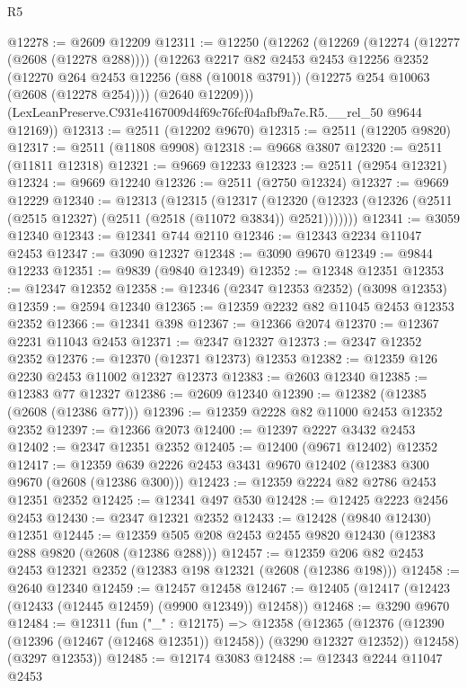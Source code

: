 \begin{lexlean}{R5}
\begin{coremodule}
@12278 := @2609 @12209
@12311 := @12250
    (@12262
      (@12269
        (@12274 (@12277 (@2608 (@12278 @288))))
        (@12263
          @2217
          @82
          @2453
          @2453
          @12256
          @2352
          (@12270 @264 @2453 @12256 (@88 (@10018 @3791)) (@12275 @254 @10063 (@2608 (@12278 @254))))
          (@2640 @12209)))
      (LexLeanPreserve.C931e4167009d4f69c76fcf04afbf9a7e.R5.__rel_50 @9644 @12169))
@12313 := @2511 (@12202 @9670)
@12315 := @2511 (@12205 @9820)
@12317 := @2511 (@11808 @9908)
@12318 := @9668 @3807
@12320 := @2511 (@11811 @12318)
@12321 := @9669 @12233
@12323 := @2511 (@2954 @12321)
@12324 := @9669 @12240
@12326 := @2511 (@2750 @12324)
@12327 := @9669 @12229
@12340 := @12313
    (@12315
      (@12317
        (@12320 (@12323 (@12326 (@2511 (@2515 @12327) (@2511 (@2518 (@11072 @3834)) @2521)))))))
@12341 := @3059 @12340
@12343 := @12341 @744 @2110
@12346 := @12343 @2234 @11047 @2453
@12347 := @3090 @12327
@12348 := @3090 @9670
@12349 := @9844 @12233
@12351 := @9839 (@9840 @12349)
@12352 := @12348 @12351
@12353 := @12347 @12352
@12358 := @12346 (@2347 @12353 @2352) (@3098 @12353)
@12359 := @2594 @12340
@12365 := @12359 @2232 @82 @11045 @2453 @12353 @2352
@12366 := @12341 @398
@12367 := @12366 @2074
@12370 := @12367 @2231 @11043 @2453
@12371 := @2347 @12327
@12373 := @2347 @12352 @2352
@12376 := @12370 (@12371 @12373) @12353
@12382 := @12359 @126 @2230 @2453 @11002 @12327 @12373
@12383 := @2603 @12340
@12385 := @12383 @77 @12327
@12386 := @2609 @12340
@12390 := @12382 (@12385 (@2608 (@12386 @77)))
@12396 := @12359 @2228 @82 @11000 @2453 @12352 @2352
@12397 := @12366 @2073
@12400 := @12397 @2227 @3432 @2453
@12402 := @2347 @12351 @2352
@12405 := @12400 (@9671 @12402) @12352
@12417 := @12359 @639 @2226 @2453 @3431 @9670 @12402 (@12383 @300 @9670 (@2608 (@12386 @300)))
@12423 := @12359 @2224 @82 @2786 @2453 @12351 @2352
@12425 := @12341 @497 @530
@12428 := @12425 @2223 @2456 @2453
@12430 := @2347 @12321 @2352
@12433 := @12428 (@9840 @12430) @12351
@12445 := @12359 @505 @208 @2453 @2455 @9820 @12430 (@12383 @288 @9820 (@2608 (@12386 @288)))
@12457 := @12359 @206 @82 @2453 @2453 @12321 @2352 (@12383 @198 @12321 (@2608 (@12386 @198)))
@12458 := @2640 @12340
@12459 := @12457 @12458
@12467 := @12405 (@12417 (@12423 (@12433 (@12445 @12459) (@9900 @12349)) @12458))
@12468 := @3290 @9670
@12484 := @12311
    (fun ("_" : @12175) =>
    @12358
      (@12365
        (@12376 (@12390 (@12396 (@12467 (@12468 @12351)) @12458)) (@3290 @12327 @12352))
        @12458)
      (@3297 @12353))
@12485 := @12174 @3083
@12488 := @12343 @2244 @11047 @2453

\end{coremodule}
\end{lexlean}
